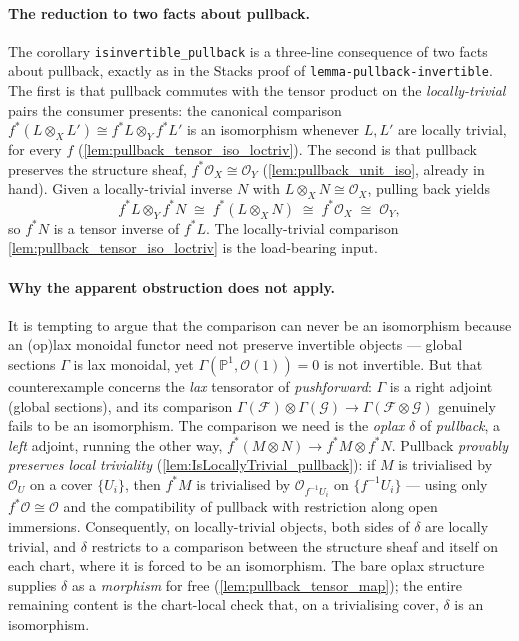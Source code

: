\paragraph{The reduction to two facts about pullback.} The corollary
\texttt{isinvertible\_pullback} is a three-line consequence of two facts about
pullback, exactly as in the Stacks proof of \texttt{lemma-pullback-invertible}. The
first is that pullback commutes with the tensor product on the \emph{locally-trivial}
pairs the consumer presents: the canonical comparison
\(f^*(L \otimes_X L') \cong f^*L \otimes_Y f^*L'\) is an isomorphism whenever
\(L, L'\) are locally trivial, for every \(f\)
(\cref{lem:pullback_tensor_iso_loctriv}). The second is that pullback preserves the
structure sheaf, \(f^*\mathcal{O}_X \cong \mathcal{O}_Y\)
(\cref{lem:pullback_unit_iso}, already in hand). Given a locally-trivial inverse
\(N\) with \(L \otimes_X N \cong \mathcal{O}_X\), pulling back yields
\[
  f^*L \otimes_Y f^*N
    \;\cong\; f^*(L \otimes_X N)
    \;\cong\; f^*\mathcal{O}_X
    \;\cong\; \mathcal{O}_Y,
\]
so \(f^*N\) is a tensor inverse of \(f^*L\). The locally-trivial comparison
\cref{lem:pullback_tensor_iso_loctriv} is the load-bearing input.

\paragraph{Why the apparent obstruction does not apply.} It is tempting to argue that
the comparison can never be an isomorphism because an (op)lax monoidal functor need
not preserve invertible objects --- global sections \(\Gamma\) is lax monoidal, yet
\(\Gamma(\mathbb{P}^1, \mathcal{O}(1)) = 0\) is not invertible. But that
counterexample concerns the \emph{lax} tensorator of \emph{pushforward}: \(\Gamma\)
is a right adjoint (global sections), and its comparison
\(\Gamma(\mathcal{F}) \otimes \Gamma(\mathcal{G}) \to \Gamma(\mathcal{F} \otimes
\mathcal{G})\) genuinely fails to be an isomorphism. The comparison we need is the
\emph{oplax} \(\delta\) of \emph{pullback}, a \emph{left} adjoint, running the other
way, \(f^*(M \otimes N) \to f^*M \otimes f^*N\). Pullback \emph{provably preserves
local triviality} (\cref{lem:IsLocallyTrivial_pullback}): if \(M\) is trivialised
by \(\mathcal{O}_U\) on a cover \(\{U_i\}\), then \(f^*M\) is trivialised by
\(\mathcal{O}_{f^{-1}U_i}\) on \(\{f^{-1}U_i\}\) --- using only
\(f^*\mathcal{O} \cong \mathcal{O}\) and the compatibility of pullback with
restriction along open immersions. Consequently, on locally-trivial objects, both
sides of \(\delta\) are locally trivial, and \(\delta\) restricts to a comparison
between the structure sheaf and itself on each chart, where it is forced to be an
isomorphism. The bare oplax structure supplies \(\delta\) as a \emph{morphism} for
free (\cref{lem:pullback_tensor_map}); the entire remaining content is the
chart-local check that, on a trivialising cover, \(\delta\) is an isomorphism.

